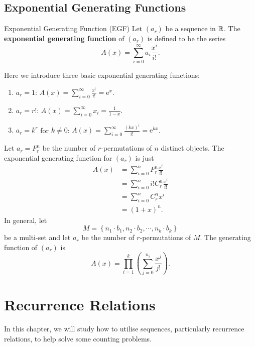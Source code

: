 \documentclass[math]{amznotes}
\theoremstyle{remark}
\newcommand{\e}{\mathrm{e}}
\begin{document}
\section{Exponential Generating Functions}
\begin{dfnbox}{Exponential Generating Function (EGF)}
    Let $(a_r)$ be a sequence in $\mathbb{R}$. The {\color{red} \textbf{exponential generating function}} of $(a_r)$ is defined to be the series
    \begin{equation*}
        A(x) = \sum_{i = 0}^{\infty}a_i\frac{x^i}{i!}.
    \end{equation*}
\end{dfnbox}
Here we introduce three basic exponential generating functions:
\begin{enumerate}
    \item $a_r = 1$: $A(x) = \sum_{i = 0}^{\infty}\frac{x^i}{i!} = \e^x$.
    \item $a_r = r!$: $A(x) = \sum_{i = 0}^{\infty}x_i = \frac{1}{1 - x}$.
    \item $a_r = k^r$ for $k \neq 0$: $A(x) = \sum_{i = 0}^{\infty}\frac{(kx)^i}{i!} = \e^{kx}$.
\end{enumerate}
Let $a_r = P^n_r$ be the number of $r$-permutations of $n$ distinct objects. The exponential generating function for $(a_r)$ is just 
\begin{align*}
    A(x) & = \sum_{i = 0}^{n}P^n_r\frac{x^i}{i!} \\
    & = \sum_{i = 0}^{n}i!C^n_r\frac{x^i}{i!} \\
    & = \sum_{i = 0}^{n}C^n_rx^i \\
    & = (1 + x)^n.
\end{align*}
In general, let 
\begin{equation*}
    M = \left\{n_1 \cdot b_1, n_2 \cdot b_2, \cdots, n_k \cdot b_k\right\}
\end{equation*}
be a multi-set and let $a_r$ be the number of $r$-permutations of $M$. The generating function of $(a_r)$ is
\begin{equation*}
    A(x) = \prod_{i = 1}^{k}\left(\sum_{j = 0}^{n_i}\frac{x^j}{j!}\right).
\end{equation*}

\chapter{Recurrence Relations}
In this chapter, we will study how to utilise sequences, particularly recurrence relations, to help solve some counting problems. 
\end{document}
